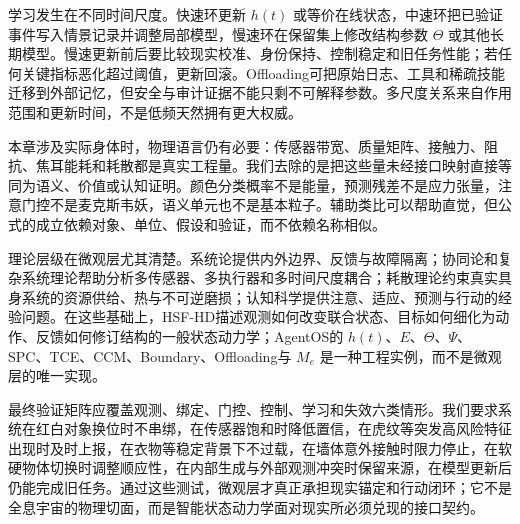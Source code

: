学习发生在不同时间尺度。快速环更新 $h(t)$ 或等价在线状态，中速环把已验证事件写入情景记录并调整局部模型，慢速环在保留集上修改结构参数 $\Theta$ 或其他长期模型。慢速更新前后要比较现实校准、身份保持、控制稳定和旧任务性能；若任何关键指标恶化超过阈值，更新回滚。Offloading可把原始日志、工具和稀疏技能迁移到外部记忆，但安全与审计证据不能只剩不可解释参数。多尺度关系来自作用范围和更新时间，不是低频天然拥有更大权威。

本章涉及实际身体时，物理语言仍有必要：传感器带宽、质量矩阵、接触力、阻抗、焦耳能耗和耗散都是真实工程量。我们去除的是把这些量未经接口映射直接等同为语义、价值或认知证明。颜色分类概率不是能量，预测残差不是应力张量，注意门控不是麦克斯韦妖，语义单元也不是基本粒子。辅助类比可以帮助直觉，但公式的成立依赖对象、单位、假设和验证，而不依赖名称相似。

理论层级在微观层尤其清楚。系统论提供内外边界、反馈与故障隔离；协同论和复杂系统理论帮助分析多传感器、多执行器和多时间尺度耦合；耗散理论约束真实具身系统的资源供给、热与不可逆磨损；认知科学提供注意、适应、预测与行动的经验问题。在这些基础上，HSF-HD描述观测如何改变联合状态、目标如何细化为动作、反馈如何修订结构的一般状态动力学；AgentOS的 $h(t)$、$E$、$\Theta$、$\Psi$、SPC、TCE、CCM、Boundary、Offloading与 $M_e$ 是一种工程实例，而不是微观层的唯一实现。

最终验证矩阵应覆盖观测、绑定、门控、控制、学习和失效六类情形。我们要求系统在红白对象换位时不串绑，在传感器饱和时降低置信，在虎纹等突发高风险特征出现时及时上报，在衣物等稳定背景下不过载，在墙体意外接触时限力停止，在软硬物体切换时调整顺应性，在内部生成与外部观测冲突时保留来源，在模型更新后仍能完成旧任务。通过这些测试，微观层才真正承担现实锚定和行动闭环；它不是全息宇宙的物理切面，而是智能状态动力学面对现实所必须兑现的接口契约。
